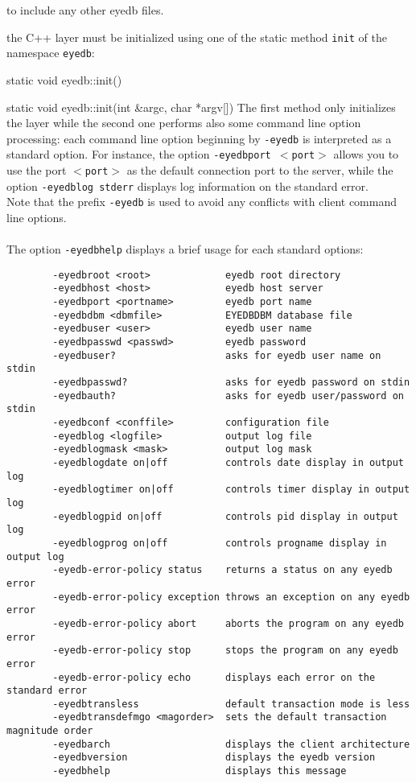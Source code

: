 to include any other eyedb files.
\item the \eyedb C++ layer must be initialized using one of the static method
\texttt{init} of the namespace \texttt{eyedb}:
\be
\item static void eyedb::init()
\item static void eyedb::init(int \&argc, char *argv[])
\ee
The first method only initializes the \eyedb layer while the second
one performs also some command line option processing: each command line option
beginning by \texttt{-eyedb} is interpreted as a standard \eyedb option.
For instance, the option \texttt{-eyedbport $<$port$>$} allows you to use
the port \texttt{$<$port$>$} as the default connection port to the \eyedb
server, while the option \texttt{-eyedblog stderr} displays log information
on the standard error.
\\
Note that the prefix \texttt{-eyedb} is used to avoid any conflicts
with client command line options.
\\
\\
The option \texttt{-eyedbhelp} displays a brief usage for each standard options:
\verbsize
\begin{verbatim}
        -eyedbroot <root>             eyedb root directory
        -eyedbhost <host>             eyedb host server
        -eyedbport <portname>         eyedb port name
        -eyedbdbm <dbmfile>           EYEDBDBM database file
        -eyedbuser <user>             eyedb user name
        -eyedbpasswd <passwd>         eyedb password
        -eyedbuser?                   asks for eyedb user name on stdin
        -eyedbpasswd?                 asks for eyedb password on stdin
        -eyedbauth?                   asks for eyedb user/password on stdin
        -eyedbconf <conffile>         configuration file
        -eyedblog <logfile>           output log file
        -eyedblogmask <mask>          output log mask
        -eyedblogdate on|off          controls date display in output log
        -eyedblogtimer on|off         controls timer display in output log
        -eyedblogpid on|off           controls pid display in output log
        -eyedblogprog on|off          controls progname display in output log
        -eyedb-error-policy status    returns a status on any eyedb error
        -eyedb-error-policy exception throws an exception on any eyedb error
        -eyedb-error-policy abort     aborts the program on any eyedb error
        -eyedb-error-policy stop      stops the program on any eyedb error
        -eyedb-error-policy echo      displays each error on the standard error
        -eyedbtransless               default transaction mode is less
        -eyedbtransdefmgo <magorder>  sets the default transaction magnitude order
        -eyedbarch                    displays the client architecture
        -eyedbversion                 displays the eyedb version
        -eyedbhelp                    displays this message
\end{verbatim}
